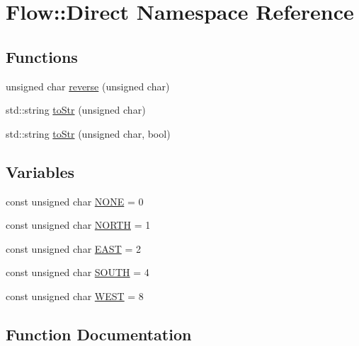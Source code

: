 \hypertarget{namespace_flow_1_1_direct}{}\section{Flow\+:\+:Direct Namespace Reference}
\label{namespace_flow_1_1_direct}
\subsection*{Functions}
\begin{DoxyCompactItemize}
\item 
unsigned char \hyperlink{namespace_flow_1_1_direct_a441c0002a213a4fd71976e704ad16f33}{reverse} (unsigned char)
\item 
std\+::string \hyperlink{namespace_flow_1_1_direct_aab9d0fe77dd3d02485b768e5c7ccff9d}{to\+Str} (unsigned char)
\item 
std\+::string \hyperlink{namespace_flow_1_1_direct_a878a0d3e7b3e67a1ed1b5b15bcdac044}{to\+Str} (unsigned char, bool)
\end{DoxyCompactItemize}
\subsection*{Variables}
\begin{DoxyCompactItemize}
\item 
const unsigned char \hyperlink{namespace_flow_1_1_direct_a3a2e55bf055fca941f5bd430389462ea}{N\+O\+NE} = 0
\item 
const unsigned char \hyperlink{namespace_flow_1_1_direct_aeaeaa2d58de609af52cf2666bf3868a7}{N\+O\+R\+TH} = 1
\item 
const unsigned char \hyperlink{namespace_flow_1_1_direct_a8ff328289a90b44b52de5251b6da59ec}{E\+A\+ST} = 2
\item 
const unsigned char \hyperlink{namespace_flow_1_1_direct_ac93371fec14643176c2413f84b02b9ad}{S\+O\+U\+TH} = 4
\item 
const unsigned char \hyperlink{namespace_flow_1_1_direct_a71884fb1eefd6b366b08e03e8eca5205}{W\+E\+ST} = 8
\end{DoxyCompactItemize}


\subsection{Function Documentation}
\hypertarget{namespace_flow_1_1_direct_a441c0002a213a4fd71976e704ad16f33}{}\label{namespace_flow_1_1_direct_a441c0002a213a4fd71976e704ad16f33} 
